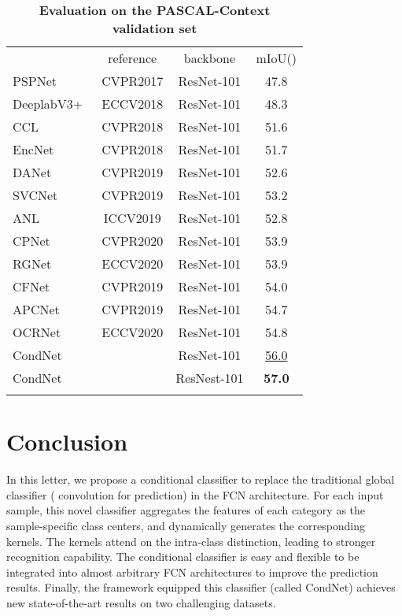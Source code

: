 \documentclass[journal]{IEEEtran}
\begin{document}
\begin{table}[t]
\centering
\setlength{\tabcolsep}{4.0pt}
\small
\renewcommand{\arraystretch}{1.4}
\caption{\textbf{Evaluation on
	the PASCAL-Context validation set}}
\label{tab:pascal_cxt}
\begin{tabular}{l|c|c|c}
\shline
\multicolumn{1}{c|}{model} & reference & backbone & mIoU() \\ 
\shline
PSPNet~\cite{Zhao-CVPR-PSPNet-2017}    & CVPR2017 & ResNet-101 & 47.8  \\
DeeplabV3+~\cite{Chen-ECCV-Deeplabv3p-2018} & ECCV2018 & ResNet-101 & 48.3 \\
CCL~\cite{Ding-CVPR-CCL-2018}       & CVPR2018 & ResNet-101 & 51.6  \\
EncNet~\cite{Zhang-CVPR-EncNet-2018}    & CVPR2018 & ResNet-101 & 51.7  \\
DANet~\cite{Fu-CVPR-DANet-2019}     & CVPR2019 & ResNet-101 & 52.6  \\
SVCNet~\cite{Ding-CVPR-SVCNet-2019} & CVPR2019 & ResNet-101 & 53.2 \\
ANL~\cite{Zhu-ICCV-ANL-2019}       & ICCV2019 & ResNet-101 & 52.8  \\
CPNet~\cite{Yu-CVPR-CPNet-2020}     & CVPR2020 & ResNet-101 & 53.9 \\
RGNet~\cite{Yu-ECCV-RepGraph-2020}     & ECCV2020 & ResNet-101 & 53.9 \\
CFNet~\cite{Zhang-CVPR-CFNet-2019}     & CVPR2019 & ResNet-101 & 54.0 \\
APCNet~\cite{He-CVPR-APCNet-2019}    & CVPR2019 & ResNet-101 & 54.7 \\
OCRNet~\cite{Yuan-ECCV-OCRNet-2019}    & ECCV2020 & ResNet-101 & 54.8 \\
\hline
CondNet & & ResNet-101  & \underline{56.0} \\
CondNet & & ResNest-101 & \textbf{57.0} \\
\shline	
\end{tabular}
\end{table}	



\section{Conclusion}
In this letter, we propose a conditional classifier 
to replace the traditional global classifier ( convolution for prediction)
in the FCN architecture.
For each input sample, this novel classifier aggregates the features of each category as the sample-specific class centers, and dynamically generates the corresponding kernels.
The kernels attend on the intra-class distinction, leading to stronger recognition capability.
The conditional classifier is easy and flexible to be integrated into almost arbitrary FCN architectures to improve the prediction results.
Finally, the framework equipped this classifier (called CondNet) achieves 
new state-of-the-art results on two challenging datasets.



\clearpage

\ifCLASSOPTIONcaptionsoff
  \newpage
\fi
\newpage


\end{document}
